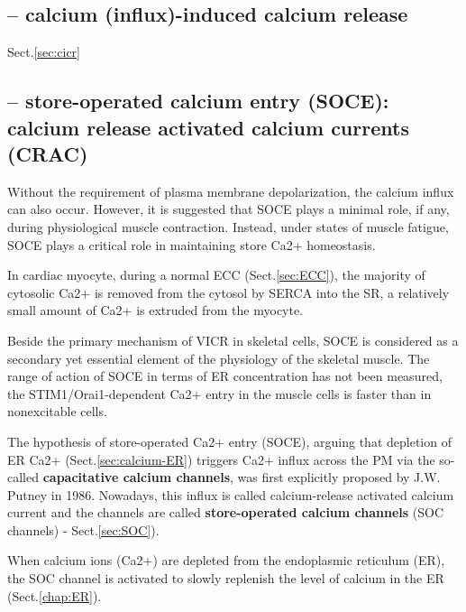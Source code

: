 \subsection{-- calcium (influx)-induced calcium release}


Sect.\ref{sec:cicr}


\subsection{-- store-operated calcium entry (SOCE): calcium release activated
calcium currents (CRAC)}
\label{sec:store-operated-calcium-entry}
\label{sec:SOCE}


Without the requirement of plasma membrane depolarization, the calcium influx
can also occur. However, it is suggested that SOCE plays a minimal role, if any,
during physiological muscle contraction. 
Instead, under states of muscle fatigue, SOCE plays a critical role in
maintaining store Ca2+ homeostasis.

In cardiac  myocyte, during a normal ECC (Sect.\ref{sec:ECC}), the majority of
cytosolic Ca2+ is removed from the cytosol by SERCA into the SR, a relatively
small amount of Ca2+ is extruded from the myocyte.

\begin{mdframed}
Beside the primary mechanism of VICR in skeletal cells, SOCE is considered as a
secondary yet essential element of the physiology of the skeletal muscle.
The range of action of SOCE in terms of ER concentration has not been measured,
the STIM1/Orai1-dependent Ca2+ entry in the muscle cells is faster than in
nonexcitable cells.


\end{mdframed}


The hypothesis of store-operated Ca2+ entry (SOCE), arguing that depletion of ER
Ca2+ (Sect.\ref{sec:calcium-ER}) triggers Ca2+ influx across the PM via the
so-called {\bf capacitative calcium channels}, was first explicitly proposed by
J.W. Putney in 1986. Nowadays, this influx is called calcium-release
activated calcium current and the channels are called {\bf store-operated calcium
channels} (SOC channels) - Sect.\ref{sec:SOC}).

When calcium ions (Ca2+) are depleted from the endoplasmic reticulum (ER), the
SOC channel is activated to slowly replenish the level of calcium in the ER
(Sect.\ref{chap:ER}).

